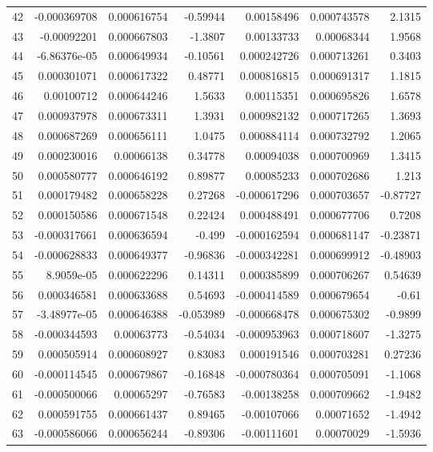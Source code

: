 \documentclass[10pt]{article}
\begin{document}
\begin{longtable}{rrrrrrr}
42 & -0.000369708 & 0.000616754 & -0.59944 & 0.00158496 & 0.000743578 & 2.1315 \\
43 & -0.00092201 & 0.000667803 & -1.3807 & 0.00133733 & 0.00068344 & 1.9568 \\
44 & -6.86376e-05 & 0.000649934 & -0.10561 & 0.000242726 & 0.000713261 & 0.3403 \\
45 & 0.000301071 & 0.000617322 & 0.48771 & 0.000816815 & 0.000691317 & 1.1815 \\
46 & 0.00100712 & 0.000644246 & 1.5633 & 0.00115351 & 0.000695826 & 1.6578 \\
47 & 0.000937978 & 0.000673311 & 1.3931 & 0.000982132 & 0.000717265 & 1.3693 \\
48 & 0.000687269 & 0.000656111 & 1.0475 & 0.000884114 & 0.000732792 & 1.2065 \\
49 & 0.000230016 & 0.00066138 & 0.34778 & 0.00094038 & 0.000700969 & 1.3415 \\
50 & 0.000580777 & 0.000646192 & 0.89877 & 0.00085233 & 0.000702686 & 1.213 \\
51 & 0.000179482 & 0.000658228 & 0.27268 & -0.000617296 & 0.000703657 & -0.87727 \\
52 & 0.000150586 & 0.000671548 & 0.22424 & 0.000488491 & 0.000677706 & 0.7208 \\
53 & -0.000317661 & 0.000636594 & -0.499 & -0.000162594 & 0.000681147 & -0.23871 \\
54 & -0.000628833 & 0.000649377 & -0.96836 & -0.000342281 & 0.000699912 & -0.48903 \\
55 & 8.9059e-05 & 0.000622296 & 0.14311 & 0.000385899 & 0.000706267 & 0.54639 \\
56 & 0.000346581 & 0.000633688 & 0.54693 & -0.000414589 & 0.000679654 & -0.61 \\
57 & -3.48977e-05 & 0.000646388 & -0.053989 & -0.000668478 & 0.000675302 & -0.9899 \\
58 & -0.000344593 & 0.00063773 & -0.54034 & -0.000953963 & 0.000718607 & -1.3275 \\
59 & 0.000505914 & 0.000608927 & 0.83083 & 0.000191546 & 0.000703281 & 0.27236 \\
60 & -0.000114545 & 0.000679867 & -0.16848 & -0.000780364 & 0.000705091 & -1.1068 \\
61 & -0.000500066 & 0.00065297 & -0.76583 & -0.00138258 & 0.000709662 & -1.9482 \\
62 & 0.000591755 & 0.000661437 & 0.89465 & -0.00107066 & 0.00071652 & -1.4942 \\
63 & -0.000586066 & 0.000656244 & -0.89306 & -0.00111601 & 0.00070029 & -1.5936 \\

\end{longtable}
\end{document}

